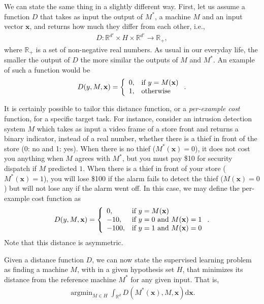 \documentclass{report}
\newcommand{\vect}[1]{\mathbf{#1}}
\newcommand{\vx}[0]{\vect{x}}
\DeclareMathOperator*{\argmin}{\arg \min}
\begin{document}
We can state the same thing in a slightly different way. First, let us assume a
function $D$ that takes as input the output of $M^*$, a machine $M$ and an input
vector $\vx$, and returns how much they differ from each other, i.e.,
\begin{align*}
    D: \mathbb{R}^{d'} \times H \times \mathbb{R}^{d'} \to \mathbb{R}_+,
\end{align*}
where $\mathbb{R}_+$ is a set of non-negative real numbers. As usual in our
everyday life, the smaller the output of $D$ the more similar the outputs of $M$
and $M^*$. An example of such a function would be
\begin{align*}
    D(y, M, \vx) = \left\{
        \begin{array}{l l}
            0, & \text{if }  y = M(\vx) \\
            1, & \text{otherwise}
        \end{array}
        \right..
\end{align*}

It is certainly possible to tailor this distance function, or a {\it
per-example cost} function, for a specific target task. For instance, consider
an intrusion detection system $M$ which takes as input a video frame of a store
front and returns a binary indicator, instead of a real number, whether there is
a thief in front of the store (0: no and 1: yes). When there is no thief
($M^*(\vx)=0$), it does not cost you anything when $M$ agrees with $M^*$, but
you must pay \$10 for security dispatch if $M$ predicted $1$. When there is a
thief in front of your store ($M^*(\vx)=1$), you will lose \$100 if the alarm
fails to detect the thief ($M(\vx)=0$) but will not lose any if the alarm went
off. In this case, we may define the per-example cost function as
\begin{align*}
    D(y, M, \vx) = \left\{
        \begin{array}{l l}
            0, & \text{if }  y=M(\vx) \\
            -10, & \text{if }  y=0\text{ and }M(\vx)=1 \\
            -100, & \text{if }  y=1\text{ and }M(\vx)=0 
        \end{array}
        \right..
\end{align*}
Note that this distance is asymmetric.

Given a distance function $D$, we can now state the supervised learning
problem as finding a machine $M$, with in a given hypothesis set $H$, that
minimizes its distance from the reference machine $M^*$ for any given input.
That is,
\begin{align}
    \label{eq:classification1}
    \argmin_{M \in H} \int_{\mathbb{R}^d} D(M^*(\vx), M, \vx) \text{d}\vx.
\end{align}
\end{document}
